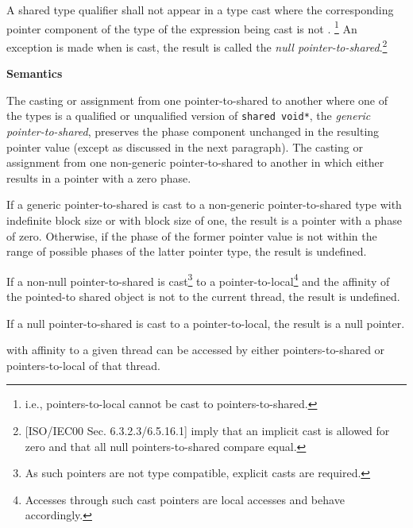 \npf A shared type qualifier shall not appear in a type cast
    where the corresponding pointer component of the type of the expression
    being cast is not .
    \footnote{i.e., pointers-to-local
    cannot be cast to pointers-to-shared.}  An exception is made when 
    is cast, the result is called the {\em null 
    pointer-to-shared}.\footnote{[ISO/IEC00 Sec.
    6.3.2.3/6.5.16.1] imply that an implicit cast is allowed for zero
    and that all null pointers-to-shared compare equal.}

{\bf Semantics} 

\np The casting or assignment from one pointer-to-shared to another 
    where one of the types is a qualified or
    unqualified version of {\tt shared void*}, the {\em generic pointer-to-shared}, 
    preserves the phase component unchanged in the resulting pointer value
    (except as discussed in the next paragraph).
    The casting or assignment from one non-generic pointer-to-shared to another
    in which either 
    results in a pointer with a zero phase.
    
\np If a generic pointer-to-shared is cast to a non-generic 
     pointer-to-shared type with indefinite block size or with block size of 
     one, the result is a pointer with a phase of zero.  Otherwise, if the
     phase of the former pointer value is not within the range of possible
     phases of the latter pointer type, the result is undefined.
  
\np If a non-null pointer-to-shared is cast\footnote{As such pointers
     are not type compatible, explicit casts are required.} to a
     pointer-to-local\footnote{Accesses through such cast pointers are
     local accesses and behave accordingly.} and the affinity
     of  the
     pointed-to shared object is not to the current thread, the result
     is undefined.
     
\np If a null pointer-to-shared is cast to a pointer-to-local,
     the result is a null pointer.    
       
\np {} with
    affinity to a given thread 
    can be accessed by either pointers-to-shared or pointers-to-local of
    that thread.

